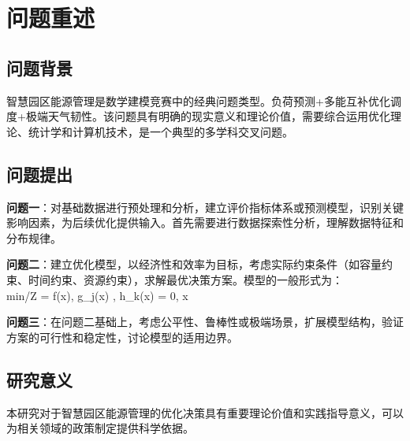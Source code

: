 \newpage
\section{问题重述}

\subsection{问题背景}
智慧园区能源管理是数学建模竞赛中的经典问题类型。负荷预测+多能互补优化调度+极端天气韧性。该问题具有明确的现实意义和理论价值，需要综合运用优化理论、统计学和计算机技术，是一个典型的多学科交叉问题。

\subsection{问题提出}
\textbf{问题一}：对基础数据进行预处理和分析，建立评价指标体系或预测模型，识别关键影响因素，为后续优化提供输入。首先需要进行数据探索性分析，理解数据特征和分布规律。

\textbf{问题二}：建立优化模型，以经济性和效率为目标，考虑实际约束条件（如容量约束、时间约束、资源约束），求解最优决策方案。模型的一般形式为：
\\min/\max \quad Z = f(x), \quad {} \quad g_j(x) , \; h_k(x) = 0, \; x \in {}

\textbf{问题三}：在问题二基础上，考虑公平性、鲁棒性或极端场景，扩展模型结构，验证方案的可行性和稳定性，讨论模型的适用边界。

\subsection{研究意义}
本研究对于智慧园区能源管理的优化决策具有重要理论价值和实践指导意义，可以为相关领域的政策制定提供科学依据。
